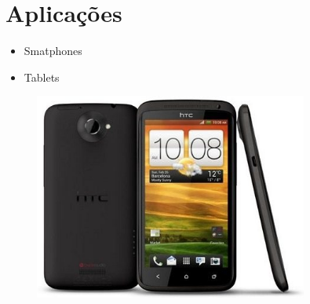 \documentclass{beamer}
\begin{document}
\section{Aplica\c{c}\~oes}
\begin{frame}
  \begin{itemize}
    \item Smatphones
    \item Tablets
  \end{itemize}
  \begin{figure}
    \centering
    \includegraphics[width=9.0cm]{./pictures/htcTegra3}
  \end{figure}
\end{frame}

    
\end{document}
